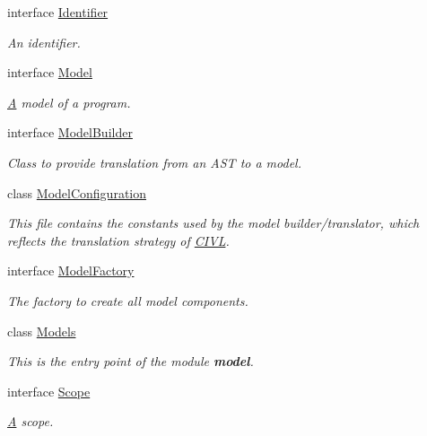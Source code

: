 \begin{DoxyCompactItemize}
interface \hyperlink{interfaceedu_1_1udel_1_1cis_1_1vsl_1_1civl_1_1model_1_1IF_1_1Identifier}{Identifier}
\begin{DoxyCompactList}\small\item\em An identifier. \end{DoxyCompactList}\item 
interface \hyperlink{interfaceedu_1_1udel_1_1cis_1_1vsl_1_1civl_1_1model_1_1IF_1_1Model}{Model}
\begin{DoxyCompactList}\small\item\em \hyperlink{structA}{A} model of a program. \end{DoxyCompactList}\item 
interface \hyperlink{interfaceedu_1_1udel_1_1cis_1_1vsl_1_1civl_1_1model_1_1IF_1_1ModelBuilder}{Model\+Builder}
\begin{DoxyCompactList}\small\item\em Class to provide translation from an A\+S\+T to a model. \end{DoxyCompactList}\item 
class \hyperlink{classedu_1_1udel_1_1cis_1_1vsl_1_1civl_1_1model_1_1IF_1_1ModelConfiguration}{Model\+Configuration}
\begin{DoxyCompactList}\small\item\em This file contains the constants used by the model builder/translator, which reflects the translation strategy of \hyperlink{classedu_1_1udel_1_1cis_1_1vsl_1_1civl_1_1CIVL}{C\+I\+V\+L}. \end{DoxyCompactList}\item 
interface \hyperlink{interfaceedu_1_1udel_1_1cis_1_1vsl_1_1civl_1_1model_1_1IF_1_1ModelFactory}{Model\+Factory}
\begin{DoxyCompactList}\small\item\em The factory to create all model components. \end{DoxyCompactList}\item 
class \hyperlink{classedu_1_1udel_1_1cis_1_1vsl_1_1civl_1_1model_1_1IF_1_1Models}{Models}
\begin{DoxyCompactList}\small\item\em This is the entry point of the module {\bfseries model}. \end{DoxyCompactList}\item 
interface \hyperlink{interfaceedu_1_1udel_1_1cis_1_1vsl_1_1civl_1_1model_1_1IF_1_1Scope}{Scope}
\begin{DoxyCompactList}\small\item\em \hyperlink{structA}{A} scope. \end{DoxyCompactList}\item 

\end{DoxyCompactItemize}
